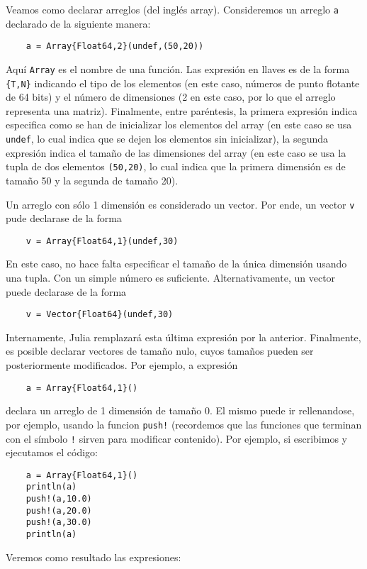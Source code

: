 \documentclass[a4paper]{article}
\begin{document}
Veamos como declarar arreglos (del ingl\'es array). 
Consideremos un arreglo \verb+a+ declarado de la siguiente manera:

\verb+    a = Array{Float64,2}(undef,(50,20))+
   
Aqu\'i \verb+Array+ es el nombre de una funci\'on. 
Las expresi\'on en llaves es de la forma \verb+{T,N}+ indicando el tipo de los elementos (en este caso, n\'umeros de punto flotante de 64 bits) y el n\'umero de dimensiones (2 en este caso, por lo que el arreglo representa una matriz). 
Finalmente, entre par\'entesis, la primera expresi\'on indica especifica como se han de inicializar los elementos del array (en este caso se usa \verb+undef+, lo cual indica que se dejen los elementos sin inicializar), la segunda expresi\'on indica el tama\~no de las dimensiones del array (en este caso se usa la tupla de dos elementos \verb+(50,20)+, lo cual indica que la primera dimensi\'on es de tama\~no 50 y la segunda de tama\~no 20). 

Un arreglo con s\'olo 1 dimensi\'on es considerado un vector. 
Por ende, un vector \verb+v+ pude declarase de la forma

\verb+    v = Array{Float64,1}(undef,30)+
    
En este caso, no hace falta especificar el tama\~no de la \'unica dimensi\'on usando una tupla. 
Con un simple n\'umero es suficiente. 
Alternativamente, un vector puede declarase de la forma

\verb+    v = Vector{Float64}(undef,30)+
    
Internamente, Julia remplazar\'a esta \'ultima expresi\'on por la anterior. 
Finalmente, es posible declarar vectores de tama\~no nulo, cuyos tama\~nos pueden ser posteriormente modificados. 
Por ejemplo, a expresi\'on

\verb+    a = Array{Float64,1}()+
    
declara un arreglo de 1 dimensi\'on de tama\~no 0. 
El mismo puede ir rellenandose, por ejemplo, usando la funcion \verb+push!+ (recordemos que las funciones que terminan con el s\'imbolo \verb+!+ sirven para modificar contenido). 
Por ejemplo, si escribimos y ejecutamos el c\'odigo:

\begin{verbatim}
    a = Array{Float64,1}()
    println(a)
    push!(a,10.0)
    push!(a,20.0)
    push!(a,30.0)
    println(a)
\end{verbatim}
    
Veremos como resultado las expresiones:
\end{document}
